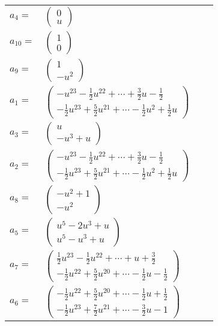 \documentclass[1p]{elsarticle_modified}
\theoremstyle{definition}
\begin{document}
\begin{tabular}{m{7pt} m{180pt} m{7pt} m{180pt} }
\flushright $a_{4}=$&$\begin{pmatrix}0\\u\end{pmatrix}$ \\
\flushright $a_{10}=$&$\begin{pmatrix}1\\0\end{pmatrix}$ \\
\flushright $a_{9}=$&$\begin{pmatrix}1\\- u^2\end{pmatrix}$ \\
\flushright $a_{1}=$&$\begin{pmatrix}- u^{23}-\frac{1}{2} u^{22}+\cdots+\frac{3}{2} u-\frac{1}{2}\\-\frac{1}{2} u^{23}+\frac{5}{2} u^{21}+\cdots-\frac{1}{2} u^2+\frac{1}{2} u\end{pmatrix}$ \\
\flushright $a_{3}=$&$\begin{pmatrix}u\\- u^3+u\end{pmatrix}$ \\
\flushright $a_{2}=$&$\begin{pmatrix}- u^{23}-\frac{1}{2} u^{22}+\cdots+\frac{3}{2} u-\frac{1}{2}\\-\frac{1}{2} u^{23}+\frac{5}{2} u^{21}+\cdots-\frac{1}{2} u^2+\frac{1}{2} u\end{pmatrix}$ \\
\flushright $a_{8}=$&$\begin{pmatrix}- u^2+1\\- u^2\end{pmatrix}$ \\
\flushright $a_{5}=$&$\begin{pmatrix}u^5-2 u^3+u\\u^5- u^3+u\end{pmatrix}$ \\
\flushright $a_{7}=$&$\begin{pmatrix}\frac{1}{2} u^{23}-\frac{1}{2} u^{22}+\cdots+u+\frac{3}{2}\\-\frac{1}{2} u^{22}+\frac{5}{2} u^{20}+\cdots-\frac{1}{2} u-\frac{1}{2}\end{pmatrix}$ \\
\flushright $a_{6}=$&$\begin{pmatrix}-\frac{1}{2} u^{22}+\frac{5}{2} u^{20}+\cdots-\frac{1}{2} u+\frac{1}{2}\\-\frac{1}{2} u^{23}+\frac{7}{2} u^{21}+\cdots-\frac{3}{2} u-1\end{pmatrix}$ \\

\end{tabular}
\end{document}
